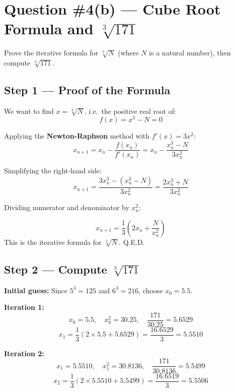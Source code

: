 \documentclass[12pt]{article}
\begin{document}
\newpage

\section{Question \#4(b) --- Cube Root Formula and $\sqrt[3]{171}$}

\begin{problembox}
Prove the iterative formula for $\sqrt[3]{N}$ (where $N$ is a natural number), then compute $\sqrt[3]{171}$.
\end{problembox}

\subsection*{Step 1 --- Proof of the Formula}

We want to find $x = \sqrt[3]{N}$, i.e.\ the positive real root of:
\[
  f(x) = x^3 - N = 0
\]

Applying the \textbf{Newton-Raphson} method with $f'(x) = 3x^2$:
\[
  x_{n+1} = x_n - \frac{f(x_n)}{f'(x_n)} = x_n - \frac{x_n^3 - N}{3x_n^2}
\]

Simplifying the right-hand side:
\[
  x_{n+1} = \frac{3x_n^3 - (x_n^3 - N)}{3x_n^2} = \frac{2x_n^3 + N}{3x_n^2}
\]

Dividing numerator and denominator by $x_n^2$:

\begin{formulabox}
\[
  \boxed{x_{n+1} = \frac{1}{3}\!\left(2x_n + \frac{N}{x_n^2}\right)}
\]
This is the iterative formula for $\sqrt[3]{N}$. \quad Q.E.D.
\end{formulabox}

\subsection*{Step 2 --- Compute $\sqrt[3]{171}$}

\textbf{Initial guess:} Since $5^3 = 125$ and $6^3 = 216$, choose $x_0 = 5.5$.

\medskip
\noindent\textbf{Iteration 1:}
\[
  x_0 = 5.5, \quad x_0^2 = 30.25, \quad \frac{171}{30.25} = 5.6529
\]
\[
  x_1 = \frac{1}{3}(2 \times 5.5 + 5.6529) = \frac{16.6529}{3} = \mathbf{5.5510}
\]

\medskip
\noindent\textbf{Iteration 2:}
\[
  x_1 = 5.5510, \quad x_1^2 = 30.8136, \quad \frac{171}{30.8136} = 5.5499
\]
\[
  x_2 = \frac{1}{3}(2 \times 5.5510 + 5.5499) = \frac{16.6519}{3} = \mathbf{5.5506}
\]
\end{document}
